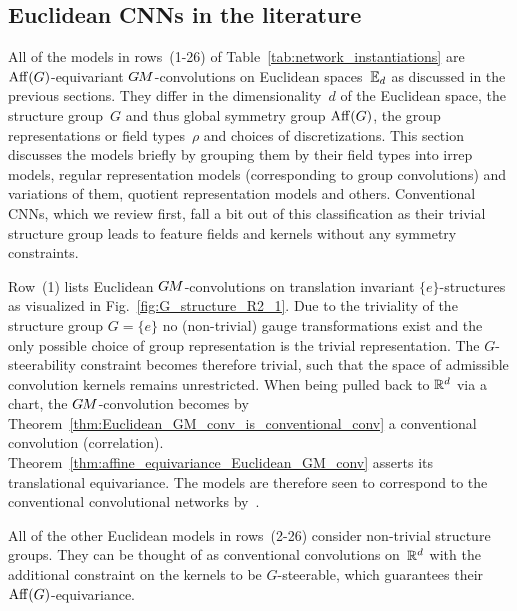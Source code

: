 

\subsection{Euclidean CNNs in the literature}
\label{sec:euclidean_literature}

All of the models in rows~(1-26) of Table~\ref{tab:network_instantiations} are $\operatorname{Aff}(G)$-equivariant $G\mkern-1.4muM$-convolutions on Euclidean spaces~$\mathbb{E}_d$ as discussed in the previous sections.
They differ in the dimensionality~$d$ of the Euclidean space, the structure group~$G$ and thus global symmetry group $\operatorname{Aff}(G)$, the group representations or field types~$\rho$ and choices of discretizations.
This section discusses the models briefly by grouping them by their field types into irrep models, regular representation models (corresponding to group convolutions) and variations of them, quotient representation models and others.
Conventional CNNs, which we review first, fall a bit out of this classification as their trivial structure group leads to feature fields and kernels without any symmetry constraints.


Row~(1) lists Euclidean $G\mkern-1.4muM$-convolutions on translation invariant $\{e\}$-structures as visualized in Fig.~\ref{fig:G_structure_R2_1}.
Due to the triviality of the structure group $G=\{e\}$ no (non-trivial) gauge transformations exist and the only possible choice of group representation is the trivial representation.
The $G$-steerability constraint becomes therefore trivial, such that the space of admissible convolution kernels remains unrestricted.
When being pulled back to $\mathbb{R}^d$ via a chart, the $G\mkern-1.4muM$-convolution becomes by Theorem~\ref{thm:Euclidean_GM_conv_is_conventional_conv} a conventional convolution (correlation).
Theorem~\ref{thm:affine_equivariance_Euclidean_GM_conv} asserts its translational equivariance.
The models are therefore seen to correspond to the conventional convolutional networks by~\citet{LeCun1990CNNs}.


All of the other Euclidean models in rows~(2-26) consider non-trivial structure groups.
They can be thought of as conventional convolutions on~$\mathbb{R}^d$ with the additional constraint on the kernels to be $G$-steerable, which guarantees their $\operatorname{Aff}(G)$-equivariance.


